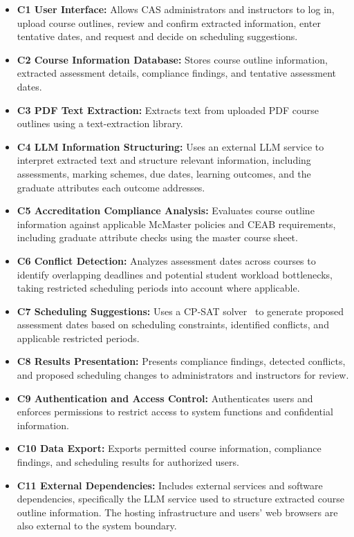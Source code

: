 \documentclass{article}
\begin{document}
\begin{itemize}
  \item \textbf{C1 User Interface:} Allows CAS administrators and instructors to log in, upload course outlines, review and confirm extracted information, enter tentative dates, and request and decide on scheduling suggestions.
  \item \textbf{C2 Course Information Database:} Stores course outline information, extracted assessment details, compliance findings, and tentative assessment dates.
  \item \textbf{C3 PDF Text Extraction:} Extracts text from uploaded PDF course outlines using a text-extraction library.
  \item \textbf{C4 LLM Information Structuring:} Uses an external LLM service to interpret extracted text and structure relevant information, including assessments, marking schemes, due dates, learning outcomes, and the graduate attributes each outcome addresses.
  \item \textbf{C5 Accreditation Compliance Analysis:} Evaluates course outline information against applicable McMaster policies and CEAB requirements, including graduate attribute checks using the master course sheet.
  \item \textbf{C6 Conflict Detection:} Analyzes assessment dates across courses to identify overlapping deadlines and potential student workload bottlenecks, taking restricted scheduling periods into account where applicable.
  \item \textbf{C7 Scheduling Suggestions:} Uses a CP-SAT solver~\citep{ORToolsCPSAT} to generate proposed assessment dates based on scheduling constraints, identified conflicts, and applicable restricted periods.
  \item \textbf{C8 Results Presentation:} Presents compliance findings, detected conflicts, and proposed scheduling changes to administrators and instructors for review.
  \item \textbf{C9 Authentication and Access Control:} Authenticates users and enforces permissions to restrict access to system functions and confidential information.
  \item \textbf{C10 Data Export:} Exports permitted course information, compliance findings, and scheduling results for authorized users.
  \item \textbf{C11 External Dependencies:} Includes external services and software dependencies, specifically the LLM service used to structure extracted course outline information. The hosting infrastructure and users' web browsers are also external to the system boundary.
\end{itemize}
\end{document}
